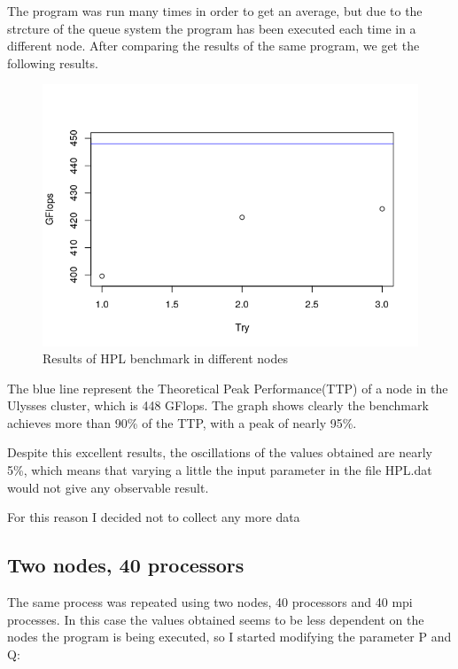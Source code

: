 \documentclass[10pt,a4paper]{article}
\begin{document}
The program was run many times in order to get an average, but due to the strcture of the queue system the program has been executed each time in a different node. After comparing the results of the same program, we get the following results.

\begin{figure}[h]
	\centering
	\includegraphics[width=1.\linewidth]{nointel}
	\caption*{Results of HPL benchmark in different nodes}
	\label{fig:nointel}
\end{figure}

The blue line represent the Theoretical Peak Performance(TTP) of a node in the Ulysses cluster, which is 448 GFlops. The graph shows clearly the benchmark achieves more than 90\% of the TTP, with a peak of nearly 95\%.

Despite this excellent results, the oscillations of the values obtained are nearly 5\%, which means that varying a little the input parameter in the file HPL.dat would not give any observable result.

For this reason I decided not to collect any more data

\subsection{Two nodes, 40 processors}

The same process was repeated using two nodes, 40 processors and 40 mpi processes. In this case the values obtained seems to be less dependent on the nodes the program is being executed, so I started modifying the parameter P and Q:
 

\vspace{1mm} %
\begin{lstlisting}
	
\end{lstlisting}
\end{document}
